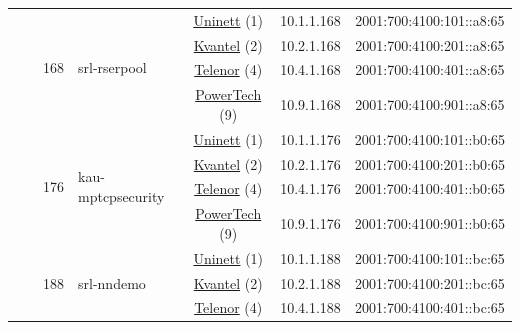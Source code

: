 \begin{small}
\begin{center}
\begin{longtable}{|c|c|c|c|c|c|c|c|}
  &  & \multirow{4}{*}{\tiny{168}} & \multicolumn{1}{|l|}{\multirow{4}{*}{\tiny{srl-rserpool}}} & \multicolumn{2}{|c|}{\tiny{\href{https://www.uninett.no}{Uninett} (1)}} & \tiny{10.1.1.168} & \tiny{2001:700:4100:101::a8:65} \\* \cline{5-5}\cline{6-6}\cline{7-7}\cline{8-8}
  &  &  &  & \multicolumn{2}{|c|}{\tiny{\href{http://kvantel.no}{Kvantel} (2)}} & \tiny{10.2.1.168} & \tiny{2001:700:4100:201::a8:65} \\* \cline{5-5}\cline{6-6}\cline{7-7}\cline{8-8}
  &  &  &  & \multicolumn{2}{|c|}{\tiny{\href{https://www.telenor.no}{Telenor} (4)}} & \tiny{10.4.1.168} & \tiny{2001:700:4100:401::a8:65} \\* \cline{5-5}\cline{6-6}\cline{7-7}\cline{8-8}
  &  &  &  & \multicolumn{2}{|c|}{\tiny{\href{http://www.powertech.no}{PowerTech} (9)}} & \tiny{10.9.1.168} & \tiny{2001:700:4100:901::a8:65} \\* \cline{3-3}\cline{4-4}\cline{5-5}\cline{6-6}\cline{7-7}\cline{8-8}
  &  & \multirow{4}{*}{\tiny{176}} & \multicolumn{1}{|l|}{\multirow{4}{*}{\tiny{kau-mptcpsecurity}}} & \multicolumn{2}{|c|}{\tiny{\href{https://www.uninett.no}{Uninett} (1)}} & \tiny{10.1.1.176} & \tiny{2001:700:4100:101::b0:65} \\* \cline{5-5}\cline{6-6}\cline{7-7}\cline{8-8}
  &  &  &  & \multicolumn{2}{|c|}{\tiny{\href{http://kvantel.no}{Kvantel} (2)}} & \tiny{10.2.1.176} & \tiny{2001:700:4100:201::b0:65} \\* \cline{5-5}\cline{6-6}\cline{7-7}\cline{8-8}
  &  &  &  & \multicolumn{2}{|c|}{\tiny{\href{https://www.telenor.no}{Telenor} (4)}} & \tiny{10.4.1.176} & \tiny{2001:700:4100:401::b0:65} \\* \cline{5-5}\cline{6-6}\cline{7-7}\cline{8-8}
  &  &  &  & \multicolumn{2}{|c|}{\tiny{\href{http://www.powertech.no}{PowerTech} (9)}} & \tiny{10.9.1.176} & \tiny{2001:700:4100:901::b0:65} \\* \cline{3-3}\cline{4-4}\cline{5-5}\cline{6-6}\cline{7-7}\cline{8-8}
  &  & \multirow{4}{*}{\tiny{188}} & \multicolumn{1}{|l|}{\multirow{4}{*}{\tiny{srl-nndemo}}} & \multicolumn{2}{|c|}{\tiny{\href{https://www.uninett.no}{Uninett} (1)}} & \tiny{10.1.1.188} & \tiny{2001:700:4100:101::bc:65} \\* \cline{5-5}\cline{6-6}\cline{7-7}\cline{8-8}
  &  &  &  & \multicolumn{2}{|c|}{\tiny{\href{http://kvantel.no}{Kvantel} (2)}} & \tiny{10.2.1.188} & \tiny{2001:700:4100:201::bc:65} \\* \cline{5-5}\cline{6-6}\cline{7-7}\cline{8-8}
  &  &  &  & \multicolumn{2}{|c|}{\tiny{\href{https://www.telenor.no}{Telenor} (4)}} & \tiny{10.4.1.188} & \tiny{2001:700:4100:401::bc:65} \\* \cline{5-5}\cline{6-6}\cline{7-7}\cline{8-8}

\end{longtable}
\end{center}
\end{small}
